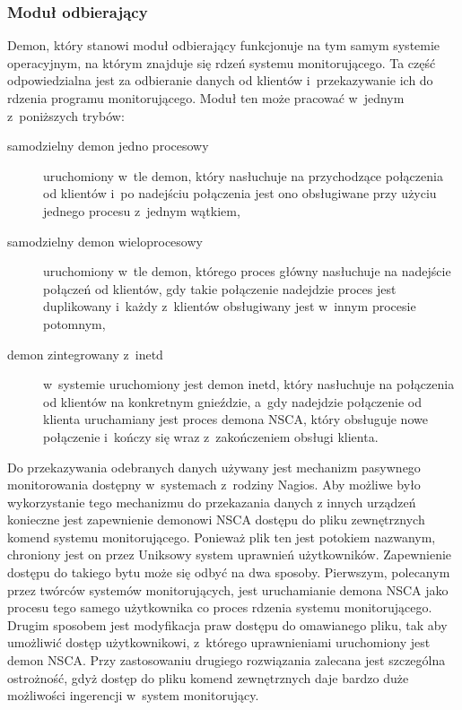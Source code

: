 \subsubsection[Moduł odbierający][Moduł odbierający]{Moduł odbierający}

Demon, który stanowi moduł odbierający funkcjonuje na tym samym
systemie operacyjnym, na którym znajduje się rdzeń systemu
monitorującego. Ta część odpowiedzialna jest za odbieranie danych od
klientów i~przekazywanie ich do rdzenia programu monitorującego. Moduł
ten może pracować w~jednym z~poniższych trybów:

\begin{description}
\item[samodzielny demon jedno procesowy] uruchomiony w~tle demon, który
  nasłuchuje na przychodzące połączenia od klientów i~po nadejściu
  połączenia jest ono obsługiwane przy użyciu jednego procesu z~jednym
  wątkiem,
\item[samodzielny demon wieloprocesowy] uruchomiony w~tle demon,
  którego proces główny nasłuchuje na nadejście połączeń od klientów,
  gdy takie połączenie nadejdzie proces jest duplikowany i~każdy
  z~klientów obsługiwany jest w~innym procesie potomnym,
\item[demon zintegrowany z~inetd] w~systemie uruchomiony jest demon
  inetd, który nasłuchuje na połączenia od klientów na konkretnym
  gnieździe, a~gdy nadejdzie połączenie od klienta uruchamiany jest
  proces demona NSCA, który obsługuje nowe połączenie i~kończy się
  wraz z~zakończeniem obsługi klienta.
\end{description}

Do przekazywania odebranych danych używany jest mechanizm pasywnego
monitorowania dostępny w~systemach z~rodziny Nagios. Aby możliwe było
wykorzystanie tego mechanizmu do przekazania danych z innych urządzeń
konieczne jest zapewnienie demonowi NSCA dostępu do pliku zewnętrznych
komend systemu monitorującego. Ponieważ plik ten jest potokiem
nazwanym, chroniony jest on przez Uniksowy system uprawnień
użytkowników. Zapewnienie dostępu do takiego bytu może się odbyć na
dwa sposoby. Pierwszym, polecanym przez twórców systemów
monitorujących, jest uruchamianie demona NSCA jako procesu tego samego
użytkownika co proces rdzenia systemu monitorującego. Drugim sposobem
jest modyfikacja praw dostępu do omawianego pliku, tak aby umożliwić
dostęp użytkownikowi, z~którego uprawnieniami uruchomiony jest demon
NSCA. Przy zastosowaniu drugiego rozwiązania zalecana jest szczególna
ostrożność, gdyż dostęp do pliku komend zewnętrznych daje bardzo duże
możliwości ingerencji w~system monitorujący.

